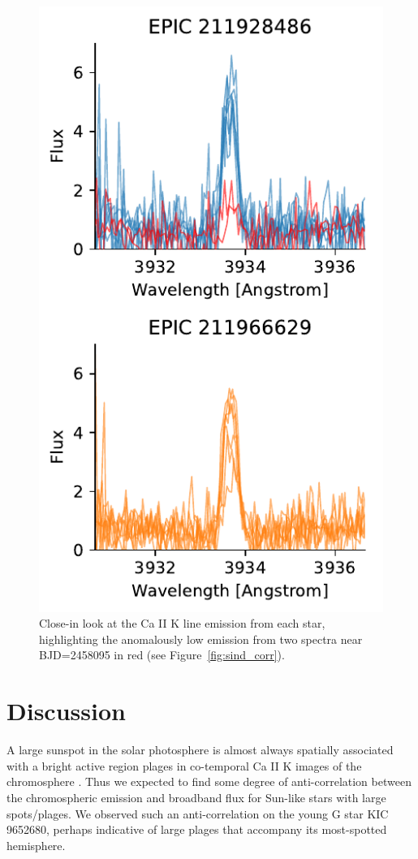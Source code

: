 \begin{figure}
    \centering
    \includegraphics{nephelion/quicklook_k.pdf}
    \caption{Close-in look at the Ca II K line emission from each star, highlighting the anomalously low emission from two spectra near BJD=2458095 in red (see Figure~\ref{fig:sind_corr}).}
    \label{fig:kline}
\end{figure}

\section{Discussion} \label{sec:discussion}

A large sunspot in the solar photosphere is almost always spatially associated with a bright active region plages in co-temporal Ca II K images of the chromosphere \citep{Stix1989, Mandal2017}. Thus we expected to find some degree of anti-correlation between the chromospheric emission and broadband flux for Sun-like stars with large spots/plages. We observed such an anti-correlation on the young G star KIC 9652680, perhaps indicative of large plages that accompany its most-spotted hemisphere. 

